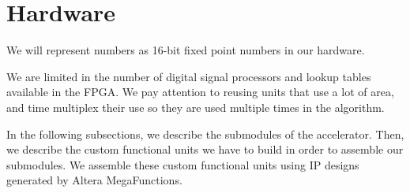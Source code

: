 \section{Hardware}

We will represent numbers as 16-bit fixed point numbers in our hardware.

We are limited in the number of digital signal processors and lookup tables available in the FPGA. We pay attention to reusing units that use a lot of area, and time multiplex their use so they are used multiple times in the algorithm.

In the following subsections, we describe the submodules of the accelerator. Then, we describe the custom functional units we have to build in order to assemble our submodules. We assemble these custom functional units using IP designs generated by Altera MegaFunctions.





